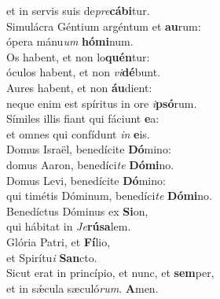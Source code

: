 \evenverse et in servis suis de\textit{pre}\textbf{cá}\textbf{bi}tur.\\
\oddverse Simulácra Géntium argéntum et \textbf{au}rum:~\*\\
\oddverse ópera mánu\textit{um} \textbf{hó}\textbf{mi}num.\\
\evenverse Os habent, et non lo\textbf{quén}tur:~\*\\
\evenverse óculos habent, et non \textit{vi}\textbf{dé}bunt.\\
\oddverse Aures habent, et non \textbf{áu}dient:~\*\\
\oddverse neque enim est spíritus in ore \textit{i}\textbf{psó}rum.\\
\evenverse Símiles illis fiant qui fáciunt \textbf{e}a:~\*\\
\evenverse et omnes qui confídunt \textit{in} \textbf{e}is.\\
\oddverse Domus Israël, benedícite \textbf{Dó}mino:~\*\\
\oddverse domus Aaron, benedíci\textit{te} \textbf{Dó}\textbf{mi}no.\\
\evenverse Domus Levi, benedícite \textbf{Dó}mino:~\*\\
\evenverse qui timétis Dóminum, benedíci\textit{te} \textbf{Dó}\textbf{mi}no.\\
\oddverse Benedíctus Dóminus ex \textbf{Si}on,~\*\\
\oddverse qui hábitat in \textit{Je}\textbf{rú}\textbf{sa}lem.\\
\evenverse Glória Patri, et \textbf{Fí}lio,~\*\\
\evenverse et Spirítu\textit{i} \textbf{San}cto.\\
\oddverse Sicut erat in princípio, et nunc, et \textbf{sem}per,~\*\\
\oddverse et in sǽcula sæculó\textit{rum}. \textbf{A}men.\\
